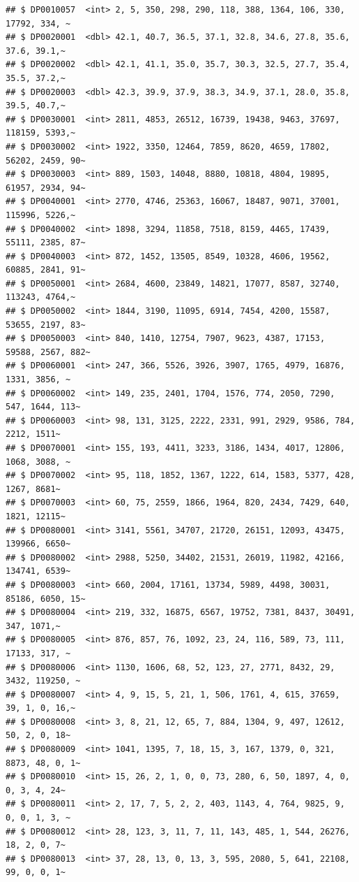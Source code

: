 \documentclass[]{article}
\begin{document}
\begin{verbatim}
## $ DP0010057  <int> 2, 5, 350, 298, 290, 118, 388, 1364, 106, 330, 17792, 334, ~
## $ DP0020001  <dbl> 42.1, 40.7, 36.5, 37.1, 32.8, 34.6, 27.8, 35.6, 37.6, 39.1,~
## $ DP0020002  <dbl> 42.1, 41.1, 35.0, 35.7, 30.3, 32.5, 27.7, 35.4, 35.5, 37.2,~
## $ DP0020003  <dbl> 42.3, 39.9, 37.9, 38.3, 34.9, 37.1, 28.0, 35.8, 39.5, 40.7,~
## $ DP0030001  <int> 2811, 4853, 26512, 16739, 19438, 9463, 37697, 118159, 5393,~
## $ DP0030002  <int> 1922, 3350, 12464, 7859, 8620, 4659, 17802, 56202, 2459, 90~
## $ DP0030003  <int> 889, 1503, 14048, 8880, 10818, 4804, 19895, 61957, 2934, 94~
## $ DP0040001  <int> 2770, 4746, 25363, 16067, 18487, 9071, 37001, 115996, 5226,~
## $ DP0040002  <int> 1898, 3294, 11858, 7518, 8159, 4465, 17439, 55111, 2385, 87~
## $ DP0040003  <int> 872, 1452, 13505, 8549, 10328, 4606, 19562, 60885, 2841, 91~
## $ DP0050001  <int> 2684, 4600, 23849, 14821, 17077, 8587, 32740, 113243, 4764,~
## $ DP0050002  <int> 1844, 3190, 11095, 6914, 7454, 4200, 15587, 53655, 2197, 83~
## $ DP0050003  <int> 840, 1410, 12754, 7907, 9623, 4387, 17153, 59588, 2567, 882~
## $ DP0060001  <int> 247, 366, 5526, 3926, 3907, 1765, 4979, 16876, 1331, 3856, ~
## $ DP0060002  <int> 149, 235, 2401, 1704, 1576, 774, 2050, 7290, 547, 1644, 113~
## $ DP0060003  <int> 98, 131, 3125, 2222, 2331, 991, 2929, 9586, 784, 2212, 1511~
## $ DP0070001  <int> 155, 193, 4411, 3233, 3186, 1434, 4017, 12806, 1068, 3088, ~
## $ DP0070002  <int> 95, 118, 1852, 1367, 1222, 614, 1583, 5377, 428, 1267, 8681~
## $ DP0070003  <int> 60, 75, 2559, 1866, 1964, 820, 2434, 7429, 640, 1821, 12115~
## $ DP0080001  <int> 3141, 5561, 34707, 21720, 26151, 12093, 43475, 139966, 6650~
## $ DP0080002  <int> 2988, 5250, 34402, 21531, 26019, 11982, 42166, 134741, 6539~
## $ DP0080003  <int> 660, 2004, 17161, 13734, 5989, 4498, 30031, 85186, 6050, 15~
## $ DP0080004  <int> 219, 332, 16875, 6567, 19752, 7381, 8437, 30491, 347, 1071,~
## $ DP0080005  <int> 876, 857, 76, 1092, 23, 24, 116, 589, 73, 111, 17133, 317, ~
## $ DP0080006  <int> 1130, 1606, 68, 52, 123, 27, 2771, 8432, 29, 3432, 119250, ~
## $ DP0080007  <int> 4, 9, 15, 5, 21, 1, 506, 1761, 4, 615, 37659, 39, 1, 0, 16,~
## $ DP0080008  <int> 3, 8, 21, 12, 65, 7, 884, 1304, 9, 497, 12612, 50, 2, 0, 18~
## $ DP0080009  <int> 1041, 1395, 7, 18, 15, 3, 167, 1379, 0, 321, 8873, 48, 0, 1~
## $ DP0080010  <int> 15, 26, 2, 1, 0, 0, 73, 280, 6, 50, 1897, 4, 0, 0, 3, 4, 24~
## $ DP0080011  <int> 2, 17, 7, 5, 2, 2, 403, 1143, 4, 764, 9825, 9, 0, 0, 1, 3, ~
## $ DP0080012  <int> 28, 123, 3, 11, 7, 11, 143, 485, 1, 544, 26276, 18, 2, 0, 7~
## $ DP0080013  <int> 37, 28, 13, 0, 13, 3, 595, 2080, 5, 641, 22108, 99, 0, 0, 1~

\end{verbatim}
\end{document}

